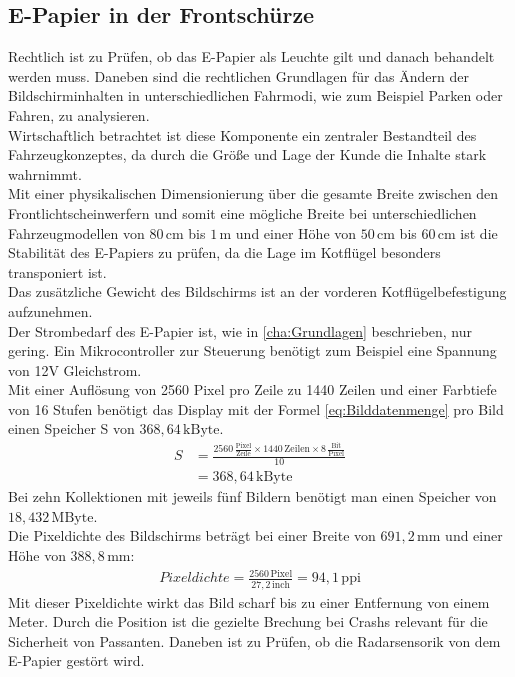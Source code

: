 \subsection{E-Papier in der Frontschürze}
Rechtlich ist zu Prüfen, ob das E-Papier als Leuchte gilt und danach behandelt werden muss. Daneben sind die rechtlichen Grundlagen für das Ändern der Bildschirminhalten in unterschiedlichen Fahrmodi, wie zum Beispiel Parken oder Fahren, zu analysieren. \\
Wirtschaftlich betrachtet ist diese Komponente ein zentraler Bestandteil des Fahrzeugkonzeptes, da durch die Größe und Lage der Kunde die Inhalte stark wahrnimmt. \\
Mit einer physikalischen Dimensionierung über die gesamte Breite zwischen den Frontlichtscheinwerfern und somit eine mögliche Breite bei unterschiedlichen Fahrzeugmodellen von $ 80\,\mathrm{cm} $ bis $ 1\,\mathrm{m} $ und einer Höhe von $ 50\,\mathrm{cm} $ bis $ 60\,\mathrm{cm} $ ist die Stabilität des E-Papiers zu prüfen, da die Lage im Kotflügel besonders transponiert ist. \\ 
Das zusätzliche Gewicht des Bildschirms ist an der vorderen Kotflügelbefestigung aufzunehmen.\\
Der Strombedarf des E-Papier ist, wie in \ref{cha:Grundlagen} beschrieben, nur gering. Ein Mikrocontroller zur Steuerung benötigt zum Beispiel eine Spannung von 12V Gleichstrom. \\
Mit einer Auflösung von 2560 Pixel pro Zeile zu 1440 Zeilen und einer Farbtiefe von 16 Stufen benötigt das Display mit der Formel \ref{eq:Bilddatenmenge} pro Bild einen Speicher S von $ 368,64\,\mathrm{kByte} $. 
\begin{align}
	S &= \frac{2560\,\frac{\mathrm{Pixel}}{\mathrm{Zeile}}\times 1440\,\mathrm{Zeilen} \times 8\,\frac{\mathrm{Bit}}{\mathrm{Pixel}}}{10} \\
	&=  368,64\,\mathrm{kByte}
\end{align}
Bei zehn Kollektionen mit jeweils fünf Bildern benötigt man einen Speicher von $ 18,432\,\mathrm{MByte} $. \\
Die Pixeldichte des Bildschirms beträgt bei einer Breite von $ 691,2\,\mathrm{mm} $ und einer Höhe von $ 388,8\,\mathrm{mm} $:
\begin{align}
	Pixeldichte = \frac{2560\,\mathrm{Pixel}}{27,2\,\mathrm{inch}} = 94,1\,\mathrm{ppi}
\end{align}
Mit dieser Pixeldichte wirkt das Bild scharf bis zu einer Entfernung von einem Meter.
Durch die Position ist die gezielte Brechung bei Crashs relevant für die Sicherheit von Passanten.
Daneben ist zu Prüfen, ob die Radarsensorik von dem E-Papier gestört wird.\\
